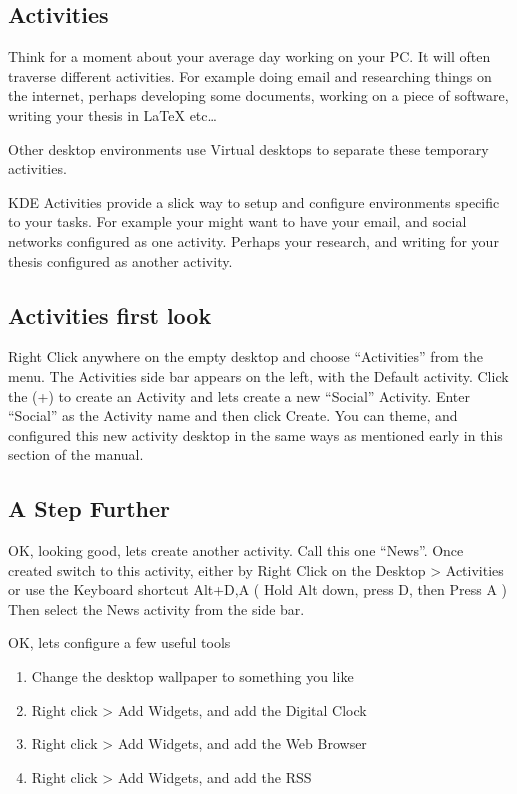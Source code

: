 \documentclass[letterpaper,10pt,english]{sphinxmanual}
\begin{document}
\subsection{Activities}
\label{\detokenize{docs/basic:activities}}
Think for a moment about your average day working on your PC. It will often traverse different activities. For example doing email and researching things on the internet, perhaps developing some documents, working on a piece of software, writing your thesis in LaTeX etc…

Other desktop environments use Virtual desktops to separate these temporary activities.

KDE Activities provide a slick way to setup and configure environments specific to your tasks. For example your might want to have your email, and social networks configured as one activity. Perhaps your research, and writing for your thesis configured as another activity.


\subsection{Activities first look}
\label{\detokenize{docs/basic:activities-first-look}}

Right Click anywhere on the empty desktop and choose “Activities” from the menu. The Activities side bar appears on the left, with the Default activity. Click the (+) to create an Activity and lets create a new “Social” Activity. Enter “Social” as the Activity name and then click Create. You can theme, and configured this new activity desktop in the same ways as mentioned early in this section of the manual.


\subsection{A Step Further}
\label{\detokenize{docs/basic:a-step-further}}
OK, looking good, lets create another activity. Call this one “News”. Once created switch to this activity, either by Right Click on the Desktop \textgreater{} Activities or use the Keyboard shortcut Alt+D,A ( Hold Alt down, press D, then Press A )
Then select the News activity from the side bar.

OK, lets configure a few useful tools
\begin{enumerate}
\def\theenumi{\arabic{enumi}}
\def\labelenumi{\theenumi .}
\makeatletter\def\p@enumii{\p@enumi \theenumi .}\makeatother
\item {} 
Change the desktop wallpaper to something you like

\item {} 
Right click \textgreater{} Add Widgets, and add the Digital Clock

\item {} 
Right click \textgreater{} Add Widgets, and add the Web Browser

\item {} 
Right click \textgreater{} Add Widgets, and add the RSS

\end{enumerate}
\end{document}
